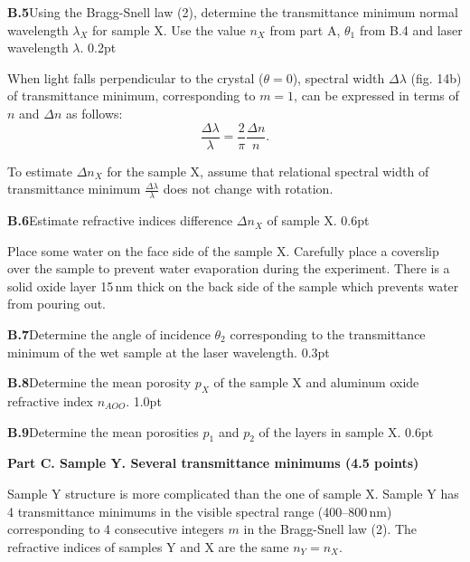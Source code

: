 \textbf{B.5}\quad Using the Bragg-Snell law (2), determine the transmittance
minimum normal wavelength $\lambda_X$ for sample X. Use the value $n_X$ from
part A, $\theta_1$ from B.4 and laser wavelength $\lambda$. \hfill 0.2pt

When light falls perpendicular to the crystal ($\theta = 0$), spectral width
$\Delta\lambda$ (fig. 14b) of transmittance minimum, corresponding to $m = 1$,
can be expressed in terms of $n$ and $\Delta n$ as follows:
\begin{equation}
\frac{\Delta\lambda}{\lambda} = \frac{2}{\pi}\frac{\Delta n}{n}.
\tag{6}
\end{equation}

To estimate $\Delta n_X$ for the sample X, assume that relational spectral
width of transmittance minimum $\frac{\Delta\lambda}{\lambda}$ does not change
with rotation.

\textbf{B.6}\quad Estimate refractive indices difference $\Delta n_X$ of sample
X. \hfill 0.6pt

Place some water on the face side of the sample X. Carefully place a coverslip
over the sample to prevent water evaporation during the experiment. There is a
solid oxide layer 15\,nm thick on the back side of the sample which prevents
water from pouring out.

\noindent{}

\textbf{B.7}\quad Determine the angle of incidence $\theta_2$ corresponding to
the transmittance minimum of the wet sample at the laser wavelength.
\hfill 0.3pt

\textbf{B.8}\quad Determine the mean porosity $p_X$ of the sample X and
aluminum oxide refractive index $n_{AOO}$. \hfill 1.0pt

\textbf{B.9}\quad Determine the mean porosities $p_1$ and $p_2$ of the layers
in sample X. \hfill 0.6pt

\textbf{Part C. Sample Y. Several transmittance minimums (4.5 points)}

Sample Y structure is more complicated than the one of sample X. Sample Y has 4
transmittance minimums in the visible spectral range (400--800\,nm)
corresponding to 4 consecutive integers $m$ in the Bragg-Snell law (2). The
refractive indices of samples Y and X are the same $n_Y = n_X$.

